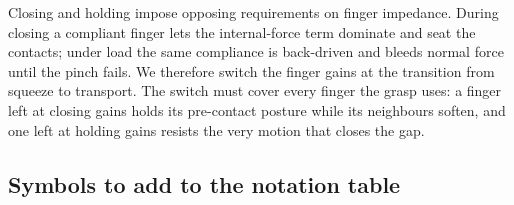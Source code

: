 Closing and holding impose opposing requirements on finger impedance. During
closing a compliant finger lets the internal-force term dominate and seat the
contacts; under load the same compliance is back-driven and bleeds normal force
until the pinch fails. We therefore switch the finger gains at the transition
from squeeze to transport. The switch must cover every finger the grasp uses: a
finger left at closing gains holds its pre-contact posture while its neighbours
soften, and one left at holding gains resists the very motion that closes the gap.

\subsection*{Symbols to add to the notation table}
\label{sec:new-symbols}
%
%
%
